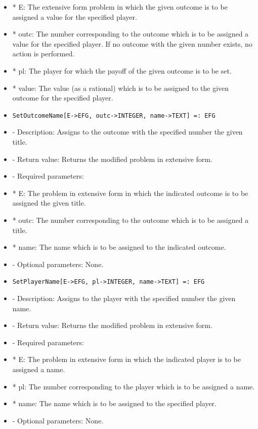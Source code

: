 \begin{itemize}
\bd
\item
*  E:  The extensive form problem in which the given outcome is to be
assigned a value for the specified player.
\item
*  outc:  The number corresponding to the outcome which is to be 
assigned a value for the specified player.  If no outcome with
the given number exists, no action is performed.
\item
*  pl:  The player for which the payoff of the given outcome is to be
set.
\item
*  value:  The value (as a rational) which is to be assigned to the 
given outcome for the specified player.
\ed
\ed

\item

\begin{verbatim}
SetOutcomeName[E->EFG, outc->INTEGER, name->TEXT] =: EFG
\end{verbatim}

\bd
\item
- Description:  Assigns to the outcome with the specified number the 
given title.
\item
- Return value:  Returns the modified problem in extensive form.
\item
- Required parameters:
	
\bd
\item
*  E:  The problem in extensive form in which the indicated outcome 
is to be assigned the given title.
\item
*  outc:  The number corresponding to the outcome which is to be 
assigned a title.
\item
*  name:  The name which is to be assigned to the indicated outcome.
\ed

\item
- Optional parameters:  None.
\ed

\item

\begin{verbatim}SetPlayerName[E->EFG, pl->INTEGER, name->TEXT] =: EFG
\end{verbatim}

\bd
\item
- Description:  Assigns to the player with the specified number the given
name.
\item
- Return value:  Returns the modified problem in extensive form.
\item
- Required parameters:

\bd
\item
*  E:  The problem in extensive form in which the indicated player is
to be assigned a name.
\item
*  pl:  The number corresponding to the player which is to be 
assigned a name.
\item
*  name:  The name which is to be assigned to the specified player.
\ed
\item
- Optional parameters:  None.
\ed


\end{itemize}
